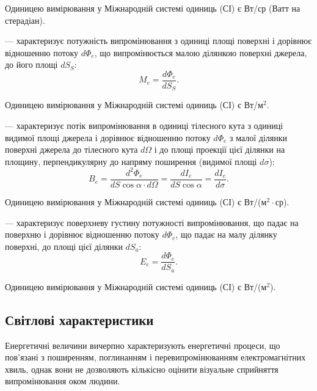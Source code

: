 Одиницею вимірювання у Міжнародній системі одиниць (СІ) є Вт/ср (Ватт на стерадіан).

\hypertarget{Radiant_exitance}{} --- характеризує потужність випромінювання з одиниці площі поверхні і дорівнює відношенню потоку $d\Phi_e$, що випромінюється малою ділянкою поверхні джерела, до його площі $dS_S$:
\begin{equation}\label{eq:Radiant_exitance}
	M_e = \frac{d\Phi_e}{dS_S}.
\end{equation}

Одиницею вимірювання у Міжнародній системі одиниць (СІ) є Вт/м$^2$.

%    
\hypertarget{Radiance}{} --- характеризує потік випромінювання в одиниці тілесного кута з одиниці видимої площі джерела і дорівнює відношенню потоку $d\Phi_e$ з малої ділянки поверхні джерела до тілесного кута $d\Omega$ і до площі проекції цієї ділянки на площину, перпендикулярну до напряму поширення (видимої площі $d\sigma$):
\begin{equation}\label{eq:Radiance}
	B_e = \frac{d^2\Phi_e}{dS\cos\alpha \cdot d\Omega} = \frac{dI_e}{dS\cos\alpha} = \frac{dI_e}{d\sigma}.
\end{equation}


Одиницею вимірювання у Міжнародній системі одиниць (СІ) є Вт/(м$^2\cdot$ср).


\hypertarget{Irradiance}{} --- характеризує поверхневу густину потужності випромінювання, що падає на поверхню і дорівнює відношенню потоку $d\Phi_{e}$, що падає на малу ділянку поверхні, до площі цієї ділянки $dS_a$:
\begin{equation}\label{eq:Irradiance}
	E_e = \frac{d\Phi_e}{dS_a}.
\end{equation}

Одиницею вимірювання у Міжнародній системі одиниць (СІ) є Вт/(м$^2$).

\subsection*{Світлові характеристики}

Енергетичні величини вичерпно характеризують енергетичні процеси, що пов'язані з поширенням, поглинанням і перевипромінюванням електромагнітних хвиль, однак вони не дозволяють кількісно оцінити візуальне сприйняття випромінювання оком людини.

